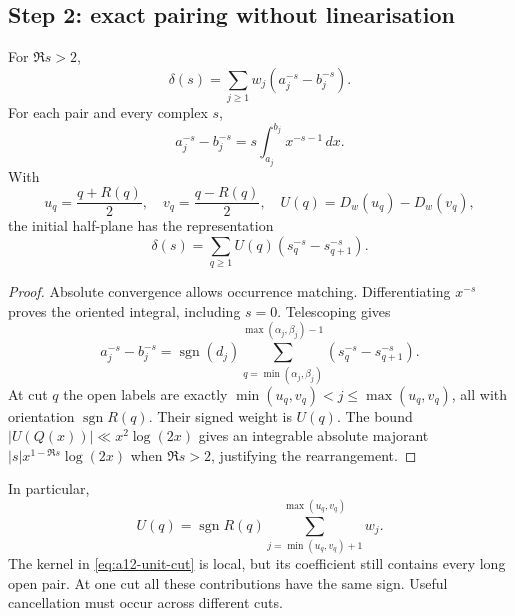 \subsection{Step 2: exact pairing without linearisation}
\label{subsec:a12-exact-pairing}
\begin{proposition}
\label{prop:a12-exact-pairing}
For $\Re s>2$,
\begin{equation}
\label{eq:a12-delta-pairs}
\delta(s)=\sum_{j\ge1}w_j(a_j^{-s}-b_j^{-s}).
\end{equation}
For each pair and every complex $s$,
\begin{equation}
\label{eq:a12-exact-integral}
a_j^{-s}-b_j^{-s}=s\int_{a_j}^{b_j}x^{-s-1}\,dx.
\end{equation}
With
\begin{equation}
\label{eq:a12-U}
u_q=\frac{q+R(q)}2,\quad v_q=\frac{q-R(q)}2,\quad
U(q)=D_w(u_q)-D_w(v_q),
\end{equation}
the initial half-plane has the representation
\begin{equation}
\label{eq:a12-unit-cut}
\boxed{\delta(s)=\sum_{q\ge1}U(q)(s_q^{-s}-s_{q+1}^{-s}).}
\end{equation}
\end{proposition}
\begin{proof}
Absolute convergence allows occurrence matching.
Differentiating $x^{-s}$ proves the oriented integral, including $s=0$.
Telescoping gives
\begin{equation}
\label{eq:a12-telescope}
a_j^{-s}-b_j^{-s}=\operatorname{sgn}(d_j)
\sum_{q=\min(\alpha_j,\beta_j)}^{\max(\alpha_j,\beta_j)-1}
(s_q^{-s}-s_{q+1}^{-s}).
\end{equation}
At cut $q$ the open labels are exactly
$\min(u_q,v_q)<j\le\max(u_q,v_q)$, all with orientation
$\operatorname{sgn}R(q)$. Their signed weight is $U(q)$.
The bound $|U(Q(x))|\ll x^2\log(2x)$ gives an integrable absolute majorant
$|s|x^{1-\Re s}\log(2x)$ when $\Re s>2$, justifying the rearrangement.
\end{proof}
In particular,
\begin{equation}
\label{eq:a12-U-block}
U(q)=\operatorname{sgn}R(q)
\sum_{j=\min(u_q,v_q)+1}^{\max(u_q,v_q)}w_j.
\end{equation}
The kernel in \eqref{eq:a12-unit-cut} is local, but its coefficient still
contains every long open pair. At one cut all these contributions have the
same sign. Useful cancellation must occur across different cuts.

